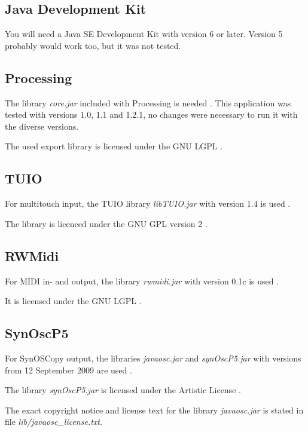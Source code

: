 \documentclass[12pt,a4paper,titlepage,oneside]{report}
\begin{document}
\subsection{Java Development Kit}

You will need a Java SE Development Kit \cite{bib:jdk} with version 6 or later. Version 5 probably would work too, but it was not tested.


\subsection{Processing}

The library \textit{core.jar} included with Processing is needed \cite{bib:processing}. This application was tested with versions 1.0, 1.1 and 1.2.1, no changes were necessary to run it with the diverse versions. 

\noindent
The used export library is licensed under the GNU LGPL \cite{bib:lgpl}.


\subsection{TUIO}

For multitouch input, the TUIO library \textit{libTUIO.jar} with version 1.4 is used \cite{bib:tuio}.

\noindent
The library is licenced under the GNU GPL version 2 \cite{bib:gpl2}.


\subsection{RWMidi}

For MIDI in- and output, the library \textit{rwmidi.jar} with version 0.1c is used \cite{bib:rwmidi}.

\noindent
It is licensed under the GNU LGPL \cite{bib:lgpl}.


\subsection{SynOscP5}

For SynOSCopy output, the libraries \textit{javaosc.jar} and \textit{synOscP5.jar} with versions from 12 September 2009 are used \cite{bib:synoscopy}.

\noindent
The library \textit{synOscP5.jar} is licensed under the Artistic License \cite{bib:artistic}.

\noindent
The exact copyright notice and license text for the library \textit{javaosc.jar} is stated in file \textit{lib/javaosc\_license.txt}.
\end{document}
